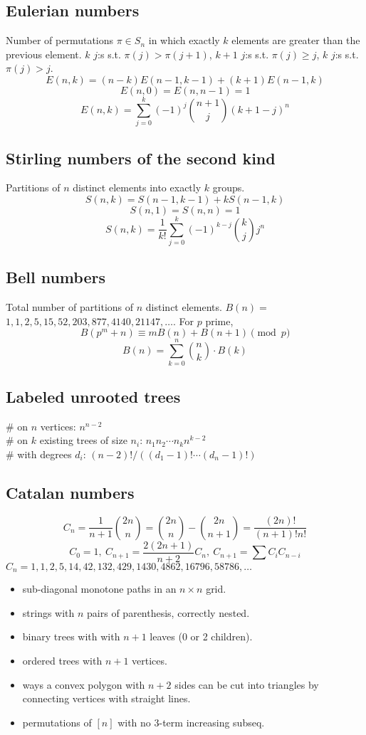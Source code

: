 	\subsection{Eulerian numbers}
		Number of permutations $\pi \in S_n$ in which exactly $k$ elements are greater than the previous element. $k$ $j$:s s.t. $\pi(j)>\pi(j+1)$, $k+1$ $j$:s s.t. $\pi(j)\geq j$, $k$ $j$:s s.t. $\pi(j)>j$.
		$$E(n,k) = (n-k)E(n-1,k-1) + (k+1)E(n-1,k)$$
		$$E(n,0) = E(n,n-1) = 1$$
		$$E(n,k) = \sum_{j=0}^k(-1)^j\binom{n+1}{j}(k+1-j)^n$$

	\subsection{Stirling numbers of the second kind}
		Partitions of $n$ distinct elements into exactly $k$ groups.
		$$S(n,k) = S(n-1,k-1) + k S(n-1,k)$$
		$$S(n,1) = S(n,n) = 1$$
		$$S(n,k) = \frac{1}{k!}\sum_{j=0}^k (-1)^{k-j}\binom{k}{j}j^n$$

	\subsection{Bell numbers}
		Total number of partitions of $n$ distinct elements. $B(n) =$
		$1, 1, 2, 5, 15, 52, 203, 877, 4140, 21147, \dots$. For $p$ prime,
		\[ B(p^m+n)\equiv mB(n)+B(n+1) \pmod{p} \]
		$$B(n) = \sum_{k=0}^n \binom{n}{k}\cdot B(k)$$

	\subsection{Labeled unrooted trees}
		\# on $n$ vertices: $n^{n-2}$ \\
		\# on $k$ existing trees of size $n_i$: $n_1n_2\cdots n_k n^{k-2}$ \\
		\# with degrees $d_i$: $(n-2)! / ((d_1-1)! \cdots (d_n-1)!)$

	\subsection{Catalan numbers}
		\[ C_n=\frac{1}{n+1}\binom{2n}{n}= \binom{2n}{n}-\binom{2n}{n+1} = \frac{(2n)!}{(n+1)!n!} \]
		\[ C_0=1,\ C_{n+1} = \frac{2(2n+1)}{n+2}C_n,\ C_{n+1}=\sum C_iC_{n-i} \]
		${C_n = 1, 1, 2, 5, 14, 42, 132, 429, 1430, 4862, 16796, 58786, \dots}$
		\begin{itemize}[noitemsep]
			\item sub-diagonal monotone paths in an $n\times n$ grid.
			\item strings with $n$ pairs of parenthesis, correctly nested.
			\item binary trees with with $n+1$ leaves (0 or 2 children).
			\item ordered trees with $n+1$ vertices.
			\item ways a convex polygon with $n+2$ sides can be cut into triangles by connecting vertices with straight lines.
			\item permutations of $[n]$ with no 3-term increasing subseq.
		\end{itemize}

